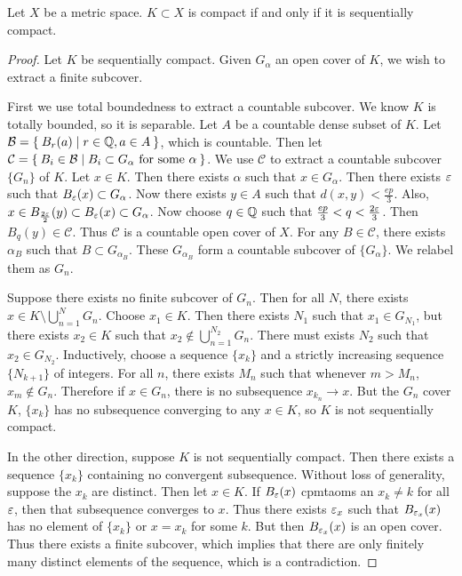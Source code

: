 \documentclass[10pt, twoside]{article}
\begin{document}
    \begin{thm}
        Let $X$ be a metric space. $K \subset X$ is compact if and only if it is sequentially compact.
        \begin{proof}
            Let $K$ be sequentially compact. Given $G_{\alpha}$ an open cover of $K$, we wish to extract a finite subcover. 
            
            First we use total boundedness to extract a countable subcover. We know $K$ is totally bounded, so it is separable. Let $A$ be a countable dense subset of $K$. Let $\mathcal{B} = \Set{B_r(a) | r \in \mathbb{Q}, a \in A}$, which is countable. Then let $\mathcal{C} = \Set{B_i \in \mathcal{B} | B_i \subset G_{\alpha} \text{ for some $\alpha$}}$. We use $\mathcal{C}$ to extract a countable subcover $\{G_n\}$ of $K$. Let $x \in K$. Then there exists $\alpha$ such that $x \in G_{\alpha}$. Then there exists $\varepsilon$ such that $B_{\varepsilon}(x) \subset G_{\alpha}$. Now there exists $y \in A$ such that $d(x,y) < \frac{ep}{3}$. Also, $x \in B_{\frac{2\varepsilon}{2}}(y) \subset B_{\varepsilon}(x) \subset G_{\alpha}$. Now choose $q \in \mathbb{Q}$ such that $\frac{ep}{3} < q < \frac{2\varepsilon}{3}$. Then $B_{q}(y) \in \mathcal{C}$. Thus $\mathcal{C}$ is a countable open cover of $X$. For any $B \in \mathcal{C}$, there exists $\alpha_B$ such that $B \subset G_{\alpha_B}$. These $G_{\alpha_B}$ form a countable subcover of $\{G_{\alpha}\}$. We relabel them as $G_n$.

            Suppose there exists no finite subcover of $G_n$. Then for all $N$, there exists $x \in K \setminus \bigcup_{n=1}^N G_n$. Choose $x_1 \in K$. Then there exists $N_1$ such that $x_1 \in G_{N_1}$, but there exists $x_2 \in K$ such that $x_2 \notin \bigcup_{n=1}^{N_2} G_n$. There must exists $N_2$ such that $x_2 \in G_{N_2}$. Inductively, choose a sequence $\{x_k\}$ and a strictly increasing sequence $\{N_{k+1}\}$ of integers. For all $n$, there exists $M_n$ such that whenever $m > M_n$, $x_m \notin G_n$. Therefore if $x \in G_n$, there is no subsequence $x_{k_n} \rightarrow x$. But the $G_n$ cover $K$, $\{x_k\}$ has no subsequence converging to any $x \in K$, so $K$ is not sequentially compact.

            In the other direction, suppose $K$ is not sequentially compact. Then there exists a sequence $\{x_k\}$ containing no convergent subsequence. Without loss of generality, suppose the $x_k$ are distinct. Then let $x \in K$. If $B_{\varepsilon}(x)$ cpmtaoms an $x_k \neq k$ for all $\varepsilon$, then that subsequence converges to $x$. Thus there exists $\varepsilon_x$ such that $B_{\varepsilon_x}(x)$ has no element of $\{x_k\}$ or $x = x_k$ for some $k$. But then $B_{\varepsilon_x}(x)$ is an open cover. Thus there exists a finite subcover, which implies that there are only finitely many distinct elements of the sequence, which is a contradiction.
        \end{proof}
    \end{thm}
\end{document}
